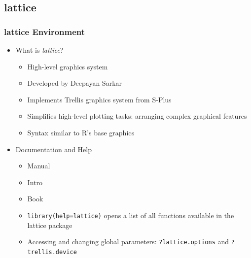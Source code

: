 \documentclass{beamer}
\newcommand{\Rfunction}[1]{{\texttt{#1}}}
\newcommand{\Rpackage}[1]{{\textit{#1}}}
\begin{document}
\subsection{lattice}
\begin{frame}[containsverbatim]  
	\frametitle{lattice Environment}
\begin{itemize}
	\item What is \Rpackage{lattice}?
        \begin{itemize}
		\item High-level graphics system 
		\item Developed by Deepayan Sarkar 
		\item Implements Trellis graphics system from S-Plus
		\item Simplifies high-level plotting tasks: arranging complex graphical features 
		\item Syntax similar to R's base graphics
        \end{itemize}
        \item Documentation and Help
        \begin{itemize}
                \item Manual \href{http://lmdvr.r-forge.r-project.org}{{}}
                \item Intro \href{http://www.his.sunderland.ac.uk/~cs0her/Statistics/UsingLatticeGraphicsInR.htm}{{}}
                \item Book \href{http://www.amazon.com/Lattice-Multivariate-Data-Visualization-Use/dp/0387759689}{{}} 
		\item \Rfunction{library(help=lattice)} opens a list of all functions available in the lattice package
		\item Accessing and changing global parameters: \Rfunction{?lattice.options} and \Rfunction{?trellis.device}
        \end{itemize}
\end{itemize}
\end{frame}
\end{document}
